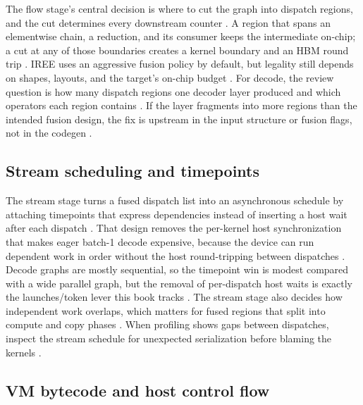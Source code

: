 The flow stage's central decision is where to cut the graph into dispatch regions, and the cut determines every downstream counter \citep{iree2024,memoryfloor2026}. A region that spans an elementwise chain, a reduction, and its consumer keeps the intermediate on-chip; a cut at any of those boundaries creates a kernel boundary and an HBM round trip \citep{dao2022flashattention,taxbreak2026}. IREE uses an aggressive fusion policy by default, but legality still depends on shapes, layouts, and the target's on-chip budget \citep{iree2024,chen2020compilerbasedhardw}. For decode, the review question is how many dispatch regions one decoder layer produced and which operators each region contains \citep{patel2025llminference,memoryfloor2026}. If the layer fragments into more regions than the intended fusion design, the fix is upstream in the input structure or fusion flags, not in the codegen \citep{chen2020compilerbasedhardw,patel2025llminference}.

\subsection{Stream scheduling and timepoints}

The stream stage turns a fused dispatch list into an asynchronous schedule by attaching timepoints that express dependencies instead of inserting a host wait after each dispatch \citep{iree2024,nvidia2024cudagraphs}. That design removes the per-kernel host synchronization that makes eager batch-1 decode expensive, because the device can run dependent work in order without the host round-tripping between dispatches \citep{taxbreak2026,memoryfloor2026}. Decode graphs are mostly sequential, so the timepoint win is modest compared with a wide parallel graph, but the removal of per-dispatch host waits is exactly the launches/token lever this book tracks \citep{patel2025llminference,taxbreak2026}. The stream stage also decides how independent work overlaps, which matters for fused regions that split into compute and copy phases \citep{iree2024,semianalysis2024tma}. When profiling shows gaps between dispatches, inspect the stream schedule for unexpected serialization before blaming the kernels \citep{memoryfloor2026,patel2025llminference}.

\subsection{VM bytecode and host control flow}

